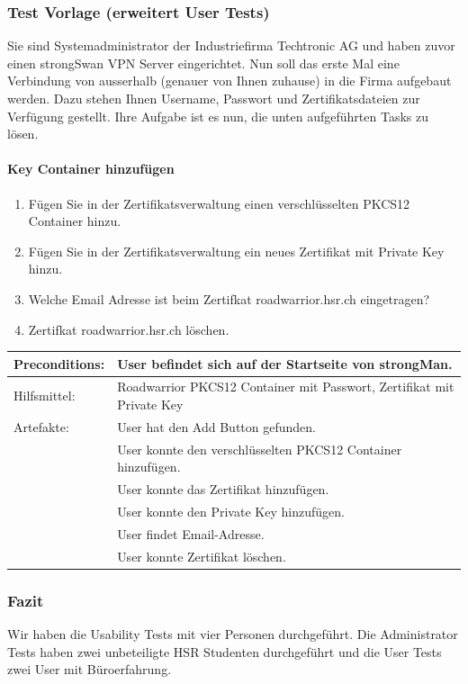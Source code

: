 \subsubsection{Test Vorlage (erweitert User Tests)}

Sie sind Systemadministrator der Industriefirma Techtronic AG und haben zuvor einen strongSwan VPN Server eingerichtet. Nun soll das erste Mal eine Verbindung von ausserhalb (genauer von Ihnen zuhause) in die Firma aufgebaut werden. Dazu stehen Ihnen Username, Passwort und Zertifikatsdateien zur Verfügung gestellt. Ihre Aufgabe ist es nun, die unten aufgeführten Tasks zu lösen.

\paragraph{Key Container hinzufügen}
\begin{enumerate}
    \item Fügen Sie in der Zertifikatsverwaltung einen verschlüsselten PKCS12 Container hinzu.
    \item Fügen Sie in der Zertifikatsverwaltung ein neues Zertifikat mit Private Key hinzu.
    \item Welche Email Adresse ist beim Zertifkat roadwarrior.hsr.ch eingetragen?
    \item Zertifkat roadwarrior.hsr.ch löschen.
\end{enumerate}


\begin{tabular}{ | p{} | p{} | }
\hline
Preconditions: & User befindet sich auf der Startseite von strongMan. \\
\hline
Hilfsmittel: & Roadwarrior PKCS12 Container mit Passwort, Zertifikat mit Private Key \\
\hline
Artefakte: & User hat den Add Button gefunden. \\
& User konnte den verschlüsselten PKCS12 Container hinzufügen. \\
& User konnte das Zertifikat hinzufügen. \\
& User konnte den Private Key hinzufügen. \\
& User findet Email-Adresse. \\
& User konnte Zertifikat löschen. \\
\hline
\end{tabular}


\subsubsection{Fazit}
Wir haben die Usability Tests mit vier Personen durchgeführt. Die Administrator Tests haben zwei unbeteiligte HSR Studenten durchgeführt und die User Tests zwei User mit Büroerfahrung.

